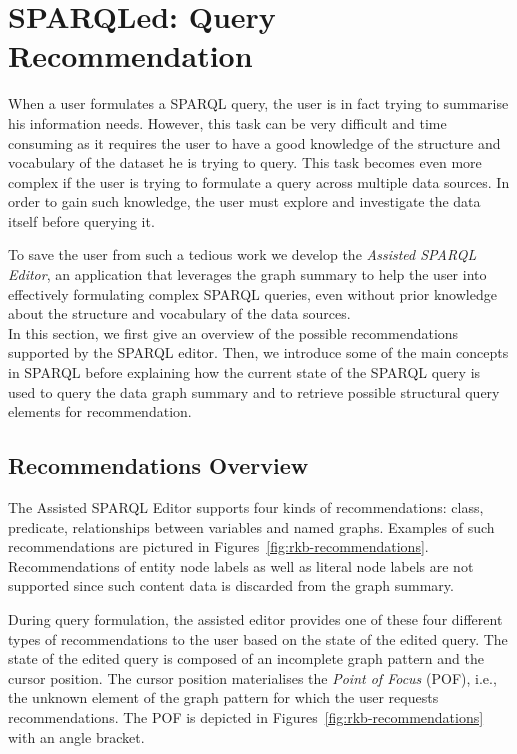 \section{SPARQLed: Query Recommendation}
\label{sec:exploiting:sparqled:recommendation}

When a user formulates a SPARQL query, the user is in fact trying to summarise his information needs. However, this task can be very difficult and time consuming as it requires the user to have a good knowledge of the structure and vocabulary of the dataset he is trying to query. This task becomes even more complex if the user is trying to formulate a query across multiple data sources. In order to gain such knowledge, the user must explore and investigate the data itself before querying it.

To save the user from such a tedious work we develop the \emph{Assisted SPARQL Editor}, an application that leverages the graph summary to help the user into effectively formulating complex SPARQL queries, even without prior knowledge about the structure and vocabulary of the data sources.\\

In this section, we first give an overview of the possible recommendations supported by the SPARQL editor. Then, we introduce some of the main concepts in SPARQL before explaining how the current state of the SPARQL query is used to query the data graph summary and to retrieve possible structural query elements for recommendation.

\subsection{Recommendations Overview}

The Assisted SPARQL Editor supports four kinds of recommendations: class, predicate, relationships between variables and named graphs. Examples of such recommendations are pictured in Figures~\ref{fig:rkb-recommendations}. Recommendations of entity node labels as well as literal node labels are not supported since such content data is discarded from the graph summary.

During query formulation, the assisted editor provides one of these four different types of recommendations to the user based on the state of the edited query. The state of the edited query is composed of an incomplete graph pattern and the cursor position. The cursor position materialises the \emph{Point of Focus} (POF), i.e., the unknown element of the graph pattern for which the user requests recommendations. The POF is depicted in Figures~\ref{fig:rkb-recommendations} with an angle bracket.

